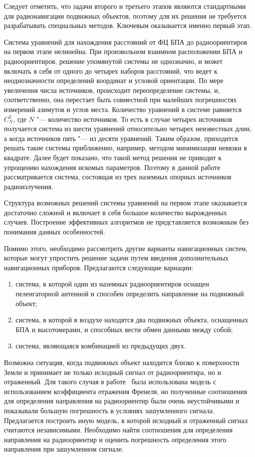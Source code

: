 \documentclass[../main.tex]{subfiles}
\begin{document}
Следует отметить, что задачи второго и третьего этапов являются стандартными для радионавигации подвижных объектов, поэтому для их решения не требуется разрабатывать специальных методов. Ключевым оказывается именно первый этап.

Система уравнений для нахождения расстояний от ФЦ БПА до радиоориентиров на первом этапе нелинейна. При произвольном взаимном расположении БПА и радиоориентиров, решение упомянутой системы не однозначно, и может включать в себя от одного до четырех наборов расстояний, что ведет к неоднозначности определений координат и угловой ориентации. По мере увеличения числа источников, происходит переопределение системы, и, соответственно, она перестает быть совместной при малейших погрешностях измерений азимутов и углов места. Количество уравнений в системе равняется $C_N^2$, где $N$ "--- количество источников. То есть в случае четырех источников получается система из шести уравнений относительно четырех неизвестных длин, а когда источников пять "--- из десяти уравнений. Таким образом, приходится решать такие системы приближенно, например, методом минимизации невязки в квадрате. Далее будет показано, что такой метод решения не приводит к упрощению нахождения искомых параметров. Поэтому в данной работе рассматривается система, состоящая из трех наземных опорных источников радиоизлучения.

Структура возможных решений системы уравнений на первом этапе оказывается достаточно сложной и включает в себя большое количество вырожденных случаев. Построение эффективных алгоритмов не представляется возможным без понимания данных особенностей.

Помимо этого, необходимо рассмотреть другие варианты навигационных систем, которые могут упростить решение задачи путем введения дополнительных навигационных приборов. Предлагаются следующие вариации:
\begin{enumerate}
    \item система, в которой один из наземных радиоориентиров оснащен пеленгаторной антенной и способен определить направление на подвижный объект;
    \item система, в которой в воздухе находятся два подвижных объекта, оснащенных БПА и высотомерами, и способных вести обмен данными между собой;
    \item система, являющаяся комбинацией из предыдущих двух.
\end{enumerate}

Возможна ситуация, когда подвижных объект находится близко к поверхности Земли и принимает не только исходный сигнал от радиоориентира, но и отраженный. Для такого случая в работе~\cite{VINOGRADOV:2017} была использована модель с использованием коэффициента отражения Френеля, но полученные соотношения для определения направления на радиоориентир были очень неустойчивыми и показывали большую погрешность в условиях зашумленного сигнала. Предлагается построить иную модель, в которой исходный и отраженный сигнал считаются независимыми. Необходимо найти соотношения для определения направления на радиоориентир и оценить погрешность определения этого направления при зашумленном сигнале.
\end{document}
